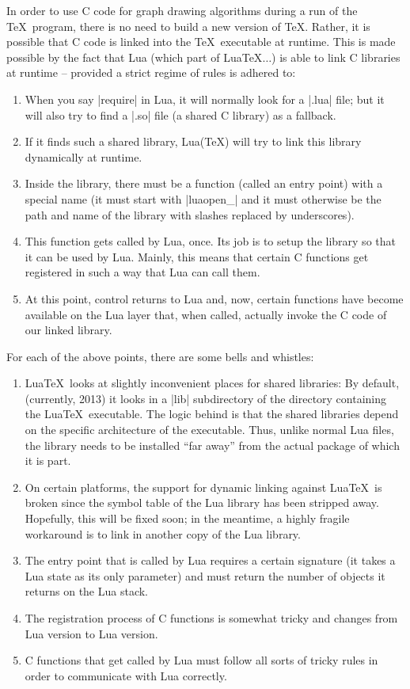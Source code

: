 In order to use C code for graph drawing algorithms during a run of
the \TeX\ program, there is no need to build a new version of
\TeX. Rather, it is possible that C code is linked into the \TeX\
executable at runtime. This is made possible by the fact that Lua
(which part of Lua\TeX$\dots$) is able to link C libraries at runtime --
provided a strict regime of rules is adhered to:

\begin{enumerate}
\item When you say |require| in Lua, it will normally look for a
  |.lua| file; but it will also try to find a |.so| file (a shared C
  library) as a fallback.
\item If it finds such a shared library, Lua(\TeX) will try to link
  this library dynamically at runtime.
\item Inside the library, there must be a function (called an entry
  point) with a special name (it must start with |luaopen_| and it
  must otherwise be the path and name of the library with slashes replaced by
  underscores).
\item This function gets called by Lua, once. Its job is to setup the
  library so that it can be used by Lua. Mainly, this means that
  certain C functions get registered in such a way that Lua can call
  them.
\item At this point, control returns to Lua and, now, certain
  functions have become available on the Lua layer that, when called,
  actually invoke the C code of our linked library.
\end{enumerate}

For each of the above points, there are some bells and whistles:

\begin{enumerate}
\item Lua\TeX\ looks at slightly inconvenient places for shared
  libraries: By default, (currently, 2013) it looks in a |lib|
  subdirectory of the directory containing the Lua\TeX\
  executable. The logic behind is that the shared libraries depend on
  the specific architecture of the executable. Thus, unlike normal Lua
  files, the library needs to be installed ``far away'' from the actual
  package of which it is part.
\item On certain platforms, the support for dynamic linking against
  Lua\TeX\ is broken since the symbol table of the Lua library has been
  stripped away. Hopefully, this will be fixed soon; in the meantime, a
  highly fragile workaround is to link in another copy of the Lua
  library.
\item The entry point that is called by Lua requires a certain
  signature (it takes a Lua state as its only parameter) and must
  return the number of objects it returns on the Lua stack.
\item The registration process of C functions is somewhat tricky and
  changes from Lua version to Lua version.
\item C functions that get called by Lua must follow all sorts of
  tricky rules in order to communicate with Lua correctly.
\end{enumerate}

